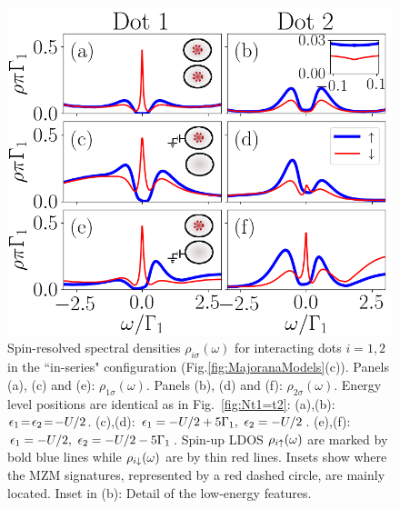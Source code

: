 \documentclass[showpacs,aps,prb,reprint,superscriptaddress]{revtex4-2}
\begin{document}
    
\begin{figure}[bt]
\begin{center}
\includegraphics[scale=0.45]{Graficos/b_Nt2gt0.png}
\caption{  \label{fig:Nt2>0} Spin-resolved spectral densities $\rho_{i \sigma}(\omega)$ for interacting  dots $i=1,2$ in the ``in-series" configuration (Fig.\ref{fig:MajoranaModels}(c)). Panels (a), (c) and (e): $\rho_{1 \sigma}(\omega)$. Panels (b), (d) and  (f): $\rho_{2 \sigma}(\omega)$. Energy level  positions are identical as in Fig.\ \ref{fig:Nt1=t2}: (a),(b): $\epsilon_1\!=\!\epsilon_2\!=\!-U/2$. (c),(d): $\epsilon_1=-U/2+5\Gamma_1, \ \epsilon_2 =-U/2$.  (e),(f): $\epsilon_1=-U/2, \ \epsilon_2 =-U/2-5\Gamma_1$.  Spin-up LDOS $\rho_{i \uparrow}(\omega)$ are marked by bold blue lines while $\rho_{i \downarrow}(\omega)$ are by thin red lines. Insets show where the MZM signatures, represented by a red dashed circle, are mainly located. Inset in (b): Detail of the low-energy features.
%
}
%

\end{center}
\end{figure}
\end{document}
